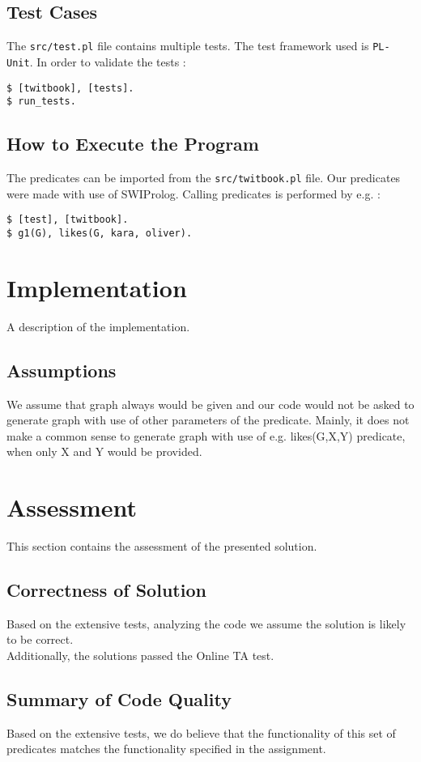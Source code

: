 \documentclass[11pt, a4paper]{article}
\begin{document}
\subsection{Test Cases}
The \texttt{src/test.pl} file contains multiple tests. The test framework used is \texttt{PL-Unit}. In order to validate the tests :
\begin{lstlisting}[style=Bash]
$ [twitbook], [tests].
$ run_tests.
\end{lstlisting}

\subsection{How to Execute the Program}
The predicates can be imported from the \texttt{src/twitbook.pl} file. Our predicates were made with use of SWIProlog. Calling predicates is performed by e.g. :
\begin{lstlisting}[style=Bash]
$ [test], [twitbook].
$ g1(G), likes(G, kara, oliver).
\end{lstlisting}

\section{Implementation}
A description of the implementation.

\subsection{Assumptions}
We assume that graph always would be given and our code would not be asked to generate graph with use of other parameters of the predicate. Mainly, it does not make a common sense to generate graph with use of e.g. likes(G,X,Y) predicate, when only X and Y would be provided. 

\section{Assessment}
This section contains the assessment of the presented solution.


\subsection{Correctness of Solution}
Based on the extensive tests, analyzing the code we assume the solution is likely to be correct.
\\
Additionally, the solutions passed the Online TA test.

\subsection{Summary of Code Quality}
Based on the extensive tests, we do believe that the functionality of this set of predicates matches the functionality specified in the assignment. 
\end{document}
